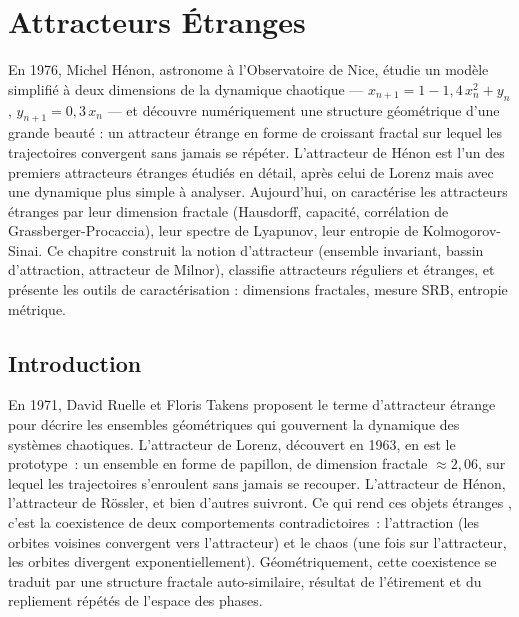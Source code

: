 \chapter{Attracteurs \'Etranges}
\label{ch:attracteurs}

En 1976, Michel Hénon, astronome à l'Observatoire de Nice, étudie un modèle simplifié à deux dimensions de la dynamique chaotique --- $x_{n+1} = 1 - 1{,}4\,x_n^2 + y_n$, $y_{n+1} = 0{,}3\,x_n$ --- et découvre numériquement une structure géométrique d'une grande beauté : un attracteur étrange en forme de croissant fractal sur lequel les trajectoires convergent sans jamais se répéter. L'attracteur de Hénon est l'un des premiers attracteurs étranges étudiés en détail, après celui de Lorenz mais avec une dynamique plus simple à analyser. Aujourd'hui, on caractérise les attracteurs étranges par leur dimension fractale (Hausdorff, capacité, corrélation de Grassberger-Procaccia), leur spectre de Lyapunov, leur entropie de Kolmogorov-Sinai. Ce chapitre construit la notion d'attracteur (ensemble invariant, bassin d'attraction, attracteur de Milnor), classifie attracteurs réguliers et étranges, et présente les outils de caractérisation : dimensions fractales, mesure SRB, entropie métrique.

\section{Introduction}

En 1971, David Ruelle et Floris Takens proposent le terme d'\og attracteur \'etrange \fg{} pour d\'ecrire les ensembles g\'eom\'etriques qui gouvernent la dynamique des syst\`emes chaotiques. L'attracteur de Lorenz, d\'ecouvert en 1963, en est le prototype~: un ensemble en forme de papillon, de dimension fractale $\approx 2{,}06$, sur lequel les trajectoires s'enroulent sans jamais se recouper. L'attracteur de H\'enon, l'attracteur de R\"ossler, et bien d'autres suivront. Ce qui rend ces objets \og \'etranges \fg, c'est la coexistence de deux comportements contradictoires~: l'attraction (les orbites voisines convergent vers l'attracteur) et le chaos (une fois sur l'attracteur, les orbites divergent exponentiellement). G\'eom\'etriquement, cette coexistence se traduit par une structure fractale auto-similaire, r\'esultat de l'\'etirement et du repliement r\'ep\'et\'es de l'espace des phases.

